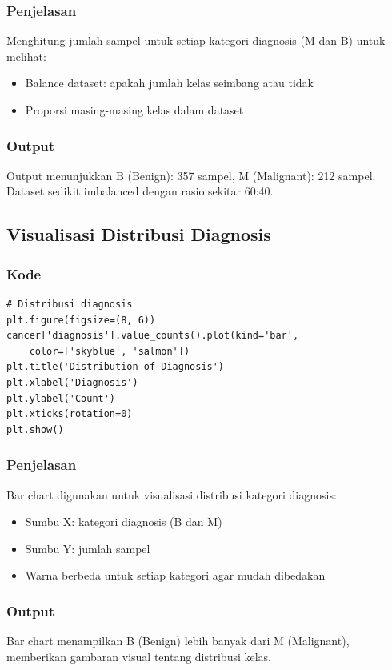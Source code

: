 \documentclass[12pt,a4paper]{article}
\begin{document}
\subsubsection{Penjelasan}
Menghitung jumlah sampel untuk setiap kategori diagnosis (M dan B) untuk melihat:
\begin{itemize}
    \item Balance dataset: apakah jumlah kelas seimbang atau tidak
    \item Proporsi masing-masing kelas dalam dataset
\end{itemize}

\subsubsection{Output}
Output menunjukkan B (Benign): 357 sampel, M (Malignant): 212 sampel. Dataset sedikit imbalanced dengan rasio sekitar 60:40.

\subsection{Visualisasi Distribusi Diagnosis}

\subsubsection{Kode}
\begin{lstlisting}[style=pythonstyle]
# Distribusi diagnosis
plt.figure(figsize=(8, 6))
cancer['diagnosis'].value_counts().plot(kind='bar', 
    color=['skyblue', 'salmon'])
plt.title('Distribution of Diagnosis')
plt.xlabel('Diagnosis')
plt.ylabel('Count')
plt.xticks(rotation=0)
plt.show()
\end{lstlisting}

\subsubsection{Penjelasan}
Bar chart digunakan untuk visualisasi distribusi kategori diagnosis:
\begin{itemize}
    \item Sumbu X: kategori diagnosis (B dan M)
    \item Sumbu Y: jumlah sampel
    \item Warna berbeda untuk setiap kategori agar mudah dibedakan
\end{itemize}

\subsubsection{Output}
Bar chart menampilkan B (Benign) lebih banyak dari M (Malignant), memberikan gambaran visual tentang distribusi kelas.
\end{document}
